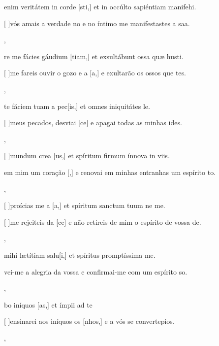 {  {\item {} enim veritátem in corde [sti,] et in occúlto sapiéntiam manifehi.~\Antiphona}%
    {\item {}[ ]{vós} amais a verdade no  e no íntimo me manifestastes a saa.~\Antiphona},
  {\item {}re me fácies gáudium [tiam,] et exsultábunt ossa quæ husti.~\Antiphona}%
    {\item {}[ ]{me} fareis ouvir o gozo e a [a,] e exultarão os ossos que tes.~\Antiphona},
  {\item {}te fáciem tuam a pec[is,] et omnes iniquitátes le.~\Antiphona}%
    {\item {}[ ]{meus} pecados, desviai [ce] e apagai todas as minhas ides.~\Antiphona},
  {\item {}[ ]{mun}dum crea [us,] et spíritum firmum ínnova in viis.~\Antiphona}%
    {\item {} em mim um coração [,] e renovai em minhas entranhas um espírito to.~\Antiphona},
  {\item {}[ ]{pro}ícias me a [a,] et spíritum sanctum tuum ne  me.~\Antiphona}%
    {\item {}[ ]{me} rejeiteis da [ce] e não retireis de mim o espírito de vossa de.~\Antiphona},
  {\item {} mihi lætítiam salu[i,] et spíritus promptíssima me.~\Antiphona}%
    {\item {}vei-me a alegria da vossa  e confir\-mai-me com um espírito so.~\Antiphona},
  {\item {}bo iníquos [as,] et ímpii ad te ~\Antiphona}%
    {\item {}[ ]{en}sinarei aos iníquos os [nhos,] e a vós se convertepios.~\Antiphona},
}
